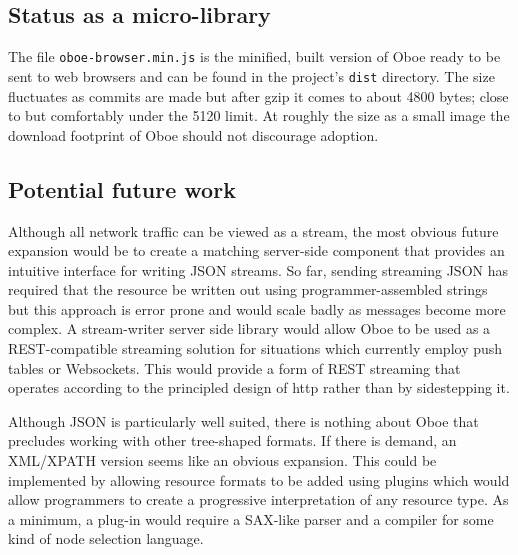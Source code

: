 \documentclass[12pt, ]{article}
\begin{document}
\subsection{Status as a micro-library}\label{status-as-a-micro-library}

The file \texttt{oboe-browser.min.js} is the minified, built version of
Oboe ready to be sent to web browsers and can be found in the project's
\texttt{dist} directory. The size fluctuates as commits are made but
after gzip it comes to about 4800 bytes; close to but comfortably under
the 5120 limit. At roughly the size as a small image the download
footprint of Oboe should not discourage adoption.

\subsection{Potential future work}\label{potential-future-work}

Although all network traffic can be viewed as a stream, the most obvious
future expansion would be to create a matching server-side component
that provides an intuitive interface for writing JSON streams. So far,
sending streaming JSON has required that the resource be written out
using programmer-assembled strings but this approach is error prone and
would scale badly as messages become more complex. A stream-writer
server side library would allow Oboe to be used as a REST-compatible
streaming solution for situations which currently employ push tables or
Websockets. This would provide a form of REST streaming that operates
according to the principled design of http rather than by sidestepping
it.

Although JSON is particularly well suited, there is nothing about Oboe
that precludes working with other tree-shaped formats. If there is
demand, an XML/XPATH version seems like an obvious expansion. This could
be implemented by allowing resource formats to be added using plugins
which would allow programmers to create a progressive interpretation of
any resource type. As a minimum, a plug-in would require a SAX-like
parser and a compiler for some kind of node selection language.
\end{document}
